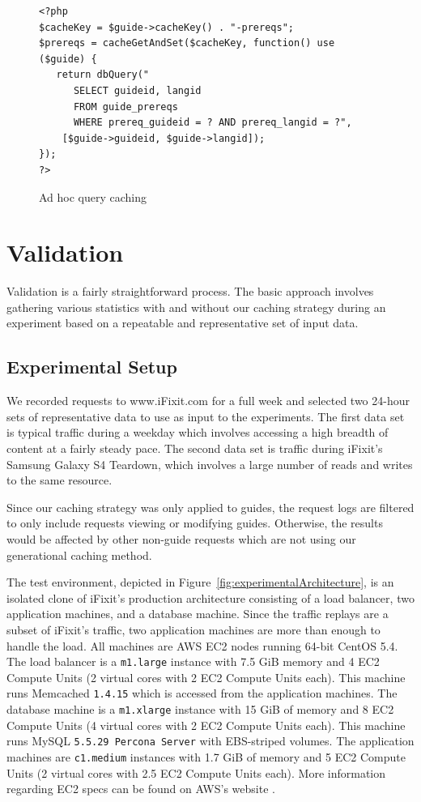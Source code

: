 \documentclass[12pt]{ucthesis}
\begin{document}
\begin{figure}[h]
\begin{ssp}
\begin{verbatim}
<?php
$cacheKey = $guide->cacheKey() . "-prereqs";
$prereqs = cacheGetAndSet($cacheKey, function() use ($guide) {
   return dbQuery("
      SELECT guideid, langid
      FROM guide_prereqs
      WHERE prereq_guideid = ? AND prereq_langid = ?",
    [$guide->guideid, $guide->langid]);
});
?>
\end{verbatim}
\end{ssp}
\caption{Ad hoc query caching}
\label{fig:adHocQueryCaching}
\end{figure}


\chapter{Validation} \label{validation}
Validation is a fairly straightforward process.
The basic approach involves gathering various statistics with and without our caching strategy during an experiment based on a repeatable and representative set of input data.

\section{Experimental Setup}
We recorded requests to \textsf{www.iFixit.com} for a full week and selected two 24-hour sets of representative data to use as input to the experiments.
The first data set is typical traffic during a weekday which involves accessing a high breadth of content at a fairly steady pace.
The second data set is traffic during \textsf{iFixit}'s Samsung Galaxy S4 Teardown\cite{ifixitGalaxyS4Teardown}, which involves a large number of reads and writes to the same resource.

Since our caching strategy was only applied to guides, the request logs are filtered to only include requests viewing or modifying guides.
Otherwise, the results would be affected by other non-guide requests which are not using our generational caching method.

The test environment, depicted in Figure~\ref{fig:experimentalArchitecture}, is an isolated clone of \textsf{iFixit}'s production architecture consisting of a load balancer, two application machines, and a database machine.
Since the traffic replays are a subset of \textsf{iFixit}'s traffic, two application machines are more than enough to handle the load.
All machines are AWS EC2 nodes running 64-bit CentOS 5.4.
The load balancer is a {\tt m1.large} instance with 7.5 GiB memory and 4 EC2 Compute Units (2 virtual cores with 2 EC2 Compute Units each).
This machine runs \textsf{Memcached} {\tt 1.4.15} which is accessed from the application machines.
The database machine is a {\tt m1.xlarge} instance with 15 GiB of memory and 8 EC2 Compute Units (4 virtual cores with 2 EC2 Compute Units each).
This machine runs \textsf{MySQL} {\tt 5.5.29 Percona Server} with EBS-striped volumes.
The application machines are {\tt c1.medium} instances with 1.7 GiB of memory and 5 EC2 Compute Units (2 virtual cores with 2.5 EC2 Compute Units each).
More information regarding EC2 specs can be found on AWS's website \cite{awsInstanceTypes}.
\end{document}
